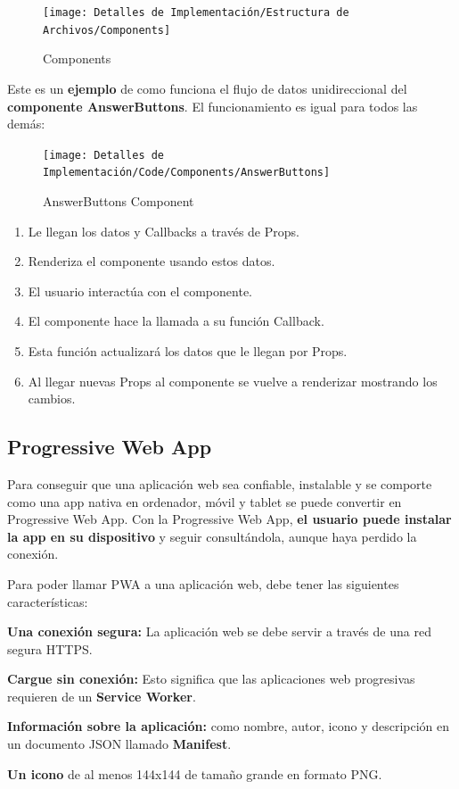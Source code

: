 \documentclass[12pt,twoside,titlepage]{report}
\begin{document}
\begin{figure}[H]
    \centering
    \texttt{[image: Detalles de Implementación/Estructura de Archivos/Components]}
    \label{fig:Components}
    \caption{Components}
\end{figure}

Este es un \textbf{ejemplo} de como funciona el flujo de datos unidireccional del \textbf{componente AnswerButtons}. El funcionamiento es igual para todos las demás: 

\begin{figure}[H]
    \centering
    \texttt{[image: Detalles de Implementación/Code/Components/AnswerButtons]}
    \label{fig:AnswerButtons}
    \caption{AnswerButtons Component}
\end{figure}

\begin{enumerate}
    \item Le llegan los datos y Callbacks a través de Props.
    \item Renderiza el componente usando estos datos.
    \item El usuario interactúa con el componente.
    \item El componente hace la llamada a su función Callback.
    \item Esta función actualizará los datos que le llegan por Props.
    \item Al llegar nuevas Props al componente se vuelve a renderizar mostrando los cambios.
\end{enumerate}


\subsection{Progressive Web App}
Para conseguir que una aplicación web sea confiable, instalable y se comporte como una app nativa en ordenador, móvil y tablet se puede convertir en Progressive Web App. Con la Progressive Web App, \textbf{el usuario puede instalar la app en su dispositivo} y seguir consultándola, aunque haya perdido la conexión.

Para poder llamar PWA a una aplicación web, debe tener las siguientes características:

\begin{compactitem}

    \item \textbf{Una conexión segura:} La aplicación web se debe servir a través de una red segura HTTPS.
    \item \textbf{Cargue sin conexión:} Esto significa que las aplicaciones web progresivas requieren de un \textbf{Service Worker}.
    \item \textbf{Información sobre la aplicación:} como nombre, autor, icono y descripción en un documento JSON llamado \textbf{Manifest}.
    \item \textbf{Un icono} de al menos 144x144 de tamaño grande en formato PNG.
\end{compactitem}
\end{document}
